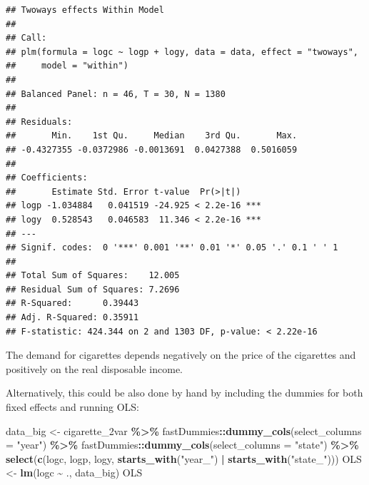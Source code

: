 \documentclass[
  a4paper,
]{article}
\newenvironment{Shaded}{\begin{snugshade}}{\end{snugshade}}
\newcommand{\AttributeTok}[1]{\textcolor[rgb]{0.13,0.29,0.53}{#1}}
\newcommand{\FunctionTok}[1]{\textcolor[rgb]{0.13,0.29,0.53}{\textbf{#1}}}
\newcommand{\NormalTok}[1]{#1}
\newcommand{\OtherTok}[1]{\textcolor[rgb]{0.56,0.35,0.01}{#1}}
\newcommand{\SpecialCharTok}[1]{\textcolor[rgb]{0.81,0.36,0.00}{\textbf{#1}}}
\newcommand{\StringTok}[1]{\textcolor[rgb]{0.31,0.60,0.02}{#1}}
\begin{document}
\begin{verbatim}
## Twoways effects Within Model
## 
## Call:
## plm(formula = logc ~ logp + logy, data = data, effect = "twoways", 
##     model = "within")
## 
## Balanced Panel: n = 46, T = 30, N = 1380
## 
## Residuals:
##       Min.    1st Qu.     Median    3rd Qu.       Max. 
## -0.4327355 -0.0372986 -0.0013691  0.0427388  0.5016059 
## 
## Coefficients:
##       Estimate Std. Error t-value  Pr(>|t|)    
## logp -1.034884   0.041519 -24.925 < 2.2e-16 ***
## logy  0.528543   0.046583  11.346 < 2.2e-16 ***
## ---
## Signif. codes:  0 '***' 0.001 '**' 0.01 '*' 0.05 '.' 0.1 ' ' 1
## 
## Total Sum of Squares:    12.005
## Residual Sum of Squares: 7.2696
## R-Squared:      0.39443
## Adj. R-Squared: 0.35911
## F-statistic: 424.344 on 2 and 1303 DF, p-value: < 2.22e-16
\end{verbatim}

The demand for cigarettes depends negatively on the price of the
cigarettes and positively on the real disposable income.

Alternatively, this could be also done by hand by including the dummies
for both fixed effects and running OLS:

\begin{Shaded}
\begin{Highlighting}[]
\NormalTok{data\_big }\OtherTok{\textless{}{-}}\NormalTok{ cigarette\_2var }\SpecialCharTok{\%\textgreater{}\%}
\NormalTok{    fastDummies}\SpecialCharTok{::}\FunctionTok{dummy\_cols}\NormalTok{(}\AttributeTok{select\_columns =} \StringTok{"year"}\NormalTok{) }\SpecialCharTok{\%\textgreater{}\%}
\NormalTok{    fastDummies}\SpecialCharTok{::}\FunctionTok{dummy\_cols}\NormalTok{(}\AttributeTok{select\_columns =} \StringTok{"state"}\NormalTok{) }\SpecialCharTok{\%\textgreater{}\%}
    \FunctionTok{select}\NormalTok{(}\FunctionTok{c}\NormalTok{(logc, logp, logy, }\FunctionTok{starts\_with}\NormalTok{(}\StringTok{"year\_"}\NormalTok{) }\SpecialCharTok{|} \FunctionTok{starts\_with}\NormalTok{(}\StringTok{"state\_"}\NormalTok{)))}
\NormalTok{OLS }\OtherTok{\textless{}{-}} \FunctionTok{lm}\NormalTok{(logc }\SpecialCharTok{\textasciitilde{}}\NormalTok{ ., data\_big)}
\NormalTok{OLS}
\end{Highlighting}
\end{Shaded}
\end{document}
